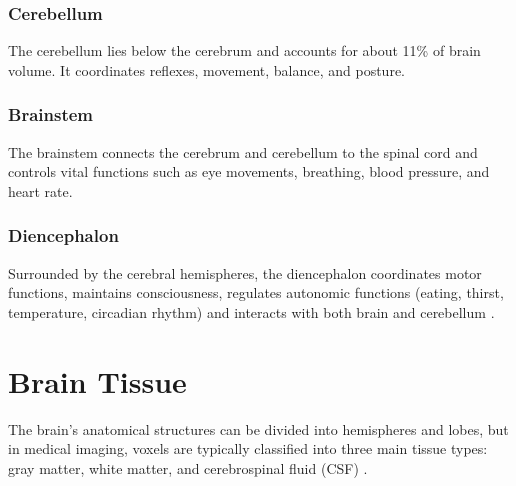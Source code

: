 
\subsubsection*{Cerebellum}
The cerebellum lies below the cerebrum and accounts for about 11\% of brain volume. It coordinates reflexes, movement, balance, and posture.

\subsubsection*{Brainstem}
The brainstem connects the cerebrum and cerebellum to the spinal cord and controls vital functions such as eye movements, breathing, blood pressure, and heart rate.

\subsubsection*{Diencephalon}
Surrounded by the cerebral hemispheres, the diencephalon coordinates motor functions, maintains consciousness, regulates autonomic functions (eating, thirst, temperature, circadian rhythm) and interacts with both brain and cerebellum \cite{ref4}.

\section{Brain Tissue}
The brain's anatomical structures can be divided into hemispheres and lobes, but in medical imaging, voxels are typically classified into three main tissue types: gray matter, white matter, and cerebrospinal fluid (CSF) \cite{ref1}.

